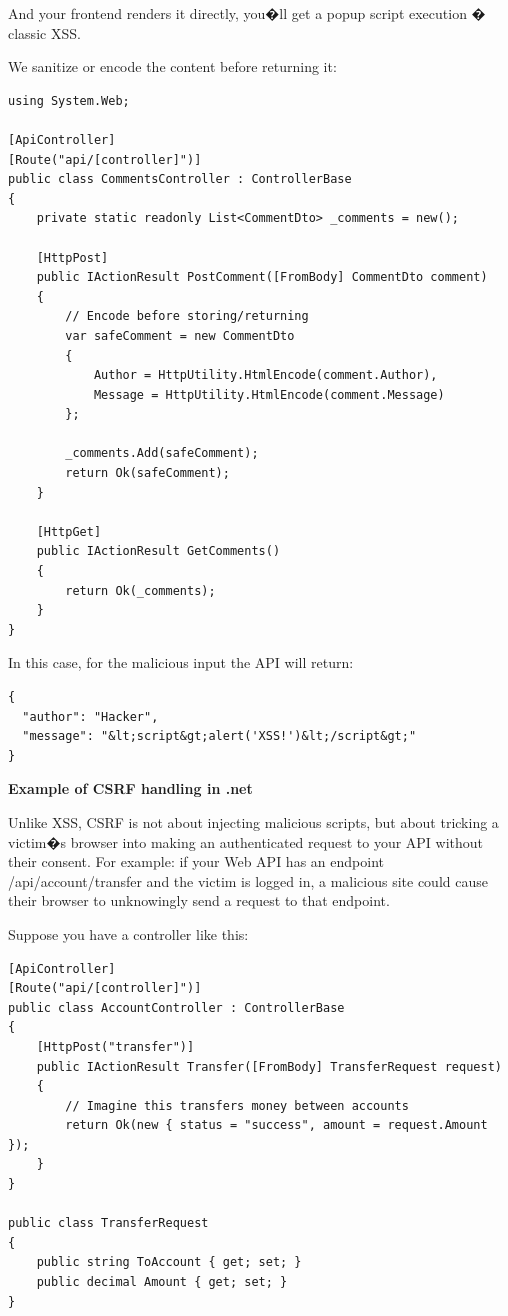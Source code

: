 And your frontend renders it directly, you�ll get a popup script execution � classic XSS.

We sanitize or encode the content before returning it:

\begin{lstlisting}
using System.Web;

[ApiController]
[Route("api/[controller]")]
public class CommentsController : ControllerBase
{
    private static readonly List<CommentDto> _comments = new();

    [HttpPost]
    public IActionResult PostComment([FromBody] CommentDto comment)
    {
        // Encode before storing/returning
        var safeComment = new CommentDto
        {
            Author = HttpUtility.HtmlEncode(comment.Author),
            Message = HttpUtility.HtmlEncode(comment.Message)
        };

        _comments.Add(safeComment);
        return Ok(safeComment);
    }

    [HttpGet]
    public IActionResult GetComments()
    {
        return Ok(_comments);
    }
}

\end{lstlisting}

In this case, for the malicious input the API will return:  

\begin{lstlisting}
{
  "author": "Hacker",
  "message": "&lt;script&gt;alert('XSS!')&lt;/script&gt;"
}

\end{lstlisting}


\textbf{Example of CSRF handling in .net}

Unlike XSS, CSRF is not about injecting malicious scripts, but about tricking a victim�s browser into making an authenticated request to your API without their consent. For example: if your Web API has an endpoint /api/account/transfer and the victim is logged in, a malicious site could cause their browser to unknowingly send a request to that endpoint.

Suppose you have a controller like this:

\begin{lstlisting}
[ApiController]
[Route("api/[controller]")]
public class AccountController : ControllerBase
{
    [HttpPost("transfer")]
    public IActionResult Transfer([FromBody] TransferRequest request)
    {
        // Imagine this transfers money between accounts
        return Ok(new { status = "success", amount = request.Amount });
    }
}

public class TransferRequest
{
    public string ToAccount { get; set; }
    public decimal Amount { get; set; }
}

\end{lstlisting}

